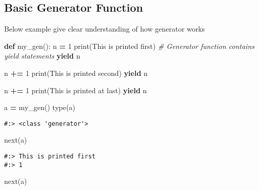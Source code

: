 \documentclass[
]{book}
\newenvironment{Shaded}{\begin{snugshade}}{\end{snugshade}}
\newcommand{\BuiltInTok}[1]{#1}
\newcommand{\CommentTok}[1]{\textcolor[rgb]{0.37,0.37,0.37}{\textit{#1}}}
\newcommand{\ControlFlowTok}[1]{\textcolor[rgb]{0.27,0.27,0.27}{\textbf{#1}}}
\newcommand{\DecValTok}[1]{\textcolor[rgb]{0.06,0.06,0.06}{#1}}
\newcommand{\KeywordTok}[1]{\textcolor[rgb]{0.27,0.27,0.27}{\textbf{#1}}}
\newcommand{\NormalTok}[1]{#1}
\newcommand{\OperatorTok}[1]{\textcolor[rgb]{0.43,0.43,0.43}{\textbf{#1}}}
\newcommand{\StringTok}[1]{\textcolor[rgb]{0.5,0.5,0.5}{#1}}
\begin{document}
\hypertarget{basic-generator-function}{%
\subsection{Basic Generator Function}\label{basic-generator-function}}

Below example give clear understanding of how generator works

\begin{Shaded}
\begin{Highlighting}[]
\KeywordTok{def}\NormalTok{ my\_gen():}
\NormalTok{    n }\OperatorTok{=} \DecValTok{1}
    \BuiltInTok{print}\NormalTok{(}\StringTok{\textquotesingle{}This is printed first\textquotesingle{}}\NormalTok{)}
    \CommentTok{\# Generator function contains yield statements}
    \ControlFlowTok{yield}\NormalTok{ n}

\NormalTok{    n }\OperatorTok{+=} \DecValTok{1}
    \BuiltInTok{print}\NormalTok{(}\StringTok{\textquotesingle{}This is printed second\textquotesingle{}}\NormalTok{)}
    \ControlFlowTok{yield}\NormalTok{ n}

\NormalTok{    n }\OperatorTok{+=} \DecValTok{1}
    \BuiltInTok{print}\NormalTok{(}\StringTok{\textquotesingle{}This is printed at last\textquotesingle{}}\NormalTok{)}
    \ControlFlowTok{yield}\NormalTok{ n}
\end{Highlighting}
\end{Shaded}

\begin{Shaded}
\begin{Highlighting}[]
\NormalTok{a }\OperatorTok{=}\NormalTok{ my\_gen()}
\BuiltInTok{type}\NormalTok{(a)}
\end{Highlighting}
\end{Shaded}

\begin{verbatim}
#:> <class 'generator'>
\end{verbatim}

\begin{Shaded}
\begin{Highlighting}[]
\BuiltInTok{next}\NormalTok{(a)}
\end{Highlighting}
\end{Shaded}

\begin{verbatim}
#:> This is printed first
#:> 1
\end{verbatim}

\begin{Shaded}
\begin{Highlighting}[]
\BuiltInTok{next}\NormalTok{(a)}
\end{Highlighting}
\end{Shaded}
\end{document}
